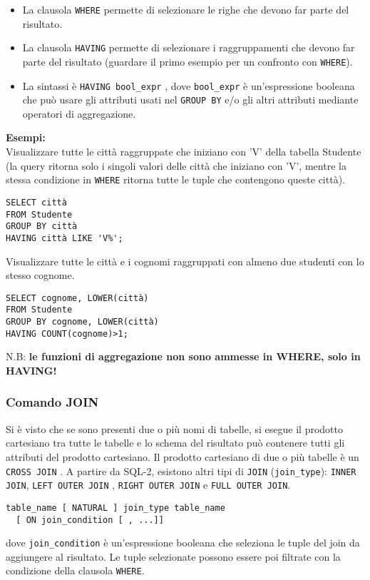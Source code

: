 \documentclass[a4paper, 10pt, titlepage]{article}
\begin{document}
		\begin{itemize}
			\item La clausola \lstinline|WHERE| permette di selezionare le righe che devono far parte
			del risultato.
			\item La clausola \lstinline|HAVING| permette di selezionare i raggruppamenti che
			devono far parte del risultato (guardare il primo esempio per un confronto con \lstinline|WHERE|).
			\item La sintassi è \lstinline|HAVING bool_expr| , dove \lstinline|bool_expr| è un'espressione
			booleana che può usare gli attributi usati nel \lstinline|GROUP BY| e/o gli altri
			attributi mediante operatori di aggregazione.
		\end{itemize}
		\textbf{Esempi: }\\
		Visualizzare tutte le città raggruppate che iniziano con ’V’ della tabella Studente (la query ritorna solo i singoli valori delle città che iniziano con 'V', mentre la stessa condizione in \lstinline|WHERE| ritorna tutte le tuple che contengono queste città).
		\begin{lstlisting}
SELECT città
FROM Studente
GROUP BY città
HAVING città LIKE 'V%';
		\end{lstlisting}
		Visualizzare tutte le città e i cognomi raggruppati con almeno due studenti
		con lo stesso cognome.
		\begin{lstlisting}
SELECT cognome, LOWER(città)
FROM Studente
GROUP BY cognome, LOWER(città)
HAVING COUNT(cognome)>1;
		\end{lstlisting}
		N.B: \textbf{le funzioni di aggregazione non sono ammesse in WHERE, solo in HAVING!}
		
		\subsubsection{Comando JOIN}
			Si è visto che se sono presenti due o più nomi di tabelle, si esegue il
			prodotto cartesiano tra tutte le tabelle e lo schema del risultato può
			contenere tutti gli attributi del prodotto cartesiano.
			Il prodotto cartesiano di due o più tabelle è un \lstinline|CROSS JOIN| .
			A partire da SQL-2, esistono altri tipi di \lstinline|JOIN| (\lstinline|join_type|):
			\lstinline|INNER JOIN|, \lstinline|LEFT OUTER JOIN| , \lstinline|RIGHT OUTER JOIN| e \lstinline|FULL OUTER JOIN|.
			
			\begin{lstlisting}
table_name [ NATURAL ] join_type table_name 
  [ ON join_condition [ , ...]]
			\end{lstlisting}
			dove \lstinline|join_condition| è un’espressione booleana che seleziona le tuple del join
			da aggiungere al risultato. Le tuple selezionate possono essere poi filtrate
			con la condizione della clausola \lstinline|WHERE|.
\end{document}
